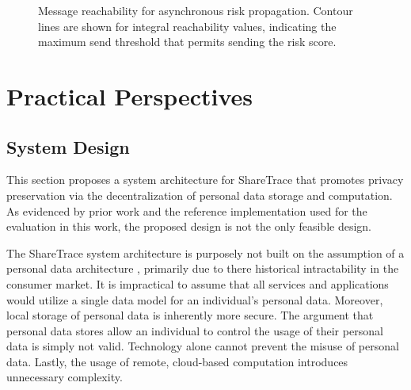 \begin{figure}[htbp]
\centering
{}
\caption[Message reachability for asynchronous risk propagation]{Message reachability for asynchronous risk propagation. Contour lines are shown for integral reachability values, indicating the maximum send threshold that permits sending the risk score.}
\label{fig:reach}
\end{figure}

\section{Practical Perspectives}

\subsection{System Design}\label{sec:system-model}

This section proposes a system architecture for ShareTrace that promotes privacy preservation via the decentralization of personal data storage and computation. As evidenced by prior work and the reference implementation used for the evaluation in this work, the proposed design is not the only feasible design.

The ShareTrace system architecture is purposely not built on the assumption of a personal data architecture \citep{Narayanan2012}, primarily due to there historical intractability in the consumer market. It is impractical to assume that all services and applications would utilize a single data model for an individual's personal data. Moreover, local storage of personal data is inherently more secure. The argument that personal data stores allow an individual to control the usage of their personal data is simply not valid. Technology alone cannot prevent the misuse of personal data. Lastly, the usage of remote, cloud-based computation introduces unnecessary complexity.

